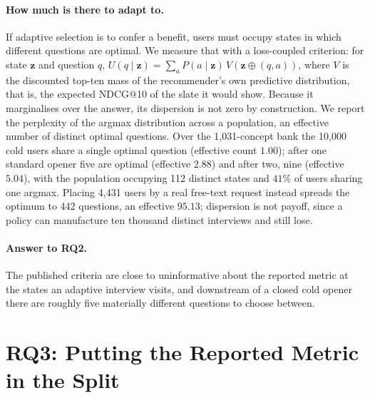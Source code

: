 \documentclass[runningheads]{llncs}
\newcommand{\zz}{\mathbf{z}}
\begin{document}
\paragraph{How much is there to adapt to.}
If adaptive selection is to confer a benefit, users must occupy states in which different questions
are optimal. We measure that with a loss-coupled criterion: for state $\zz$ and question $q$,
$U(q\mid\zz)=\sum_a P(a\mid\zz)\,V(\zz\oplus(q,a))$, where $V$ is the discounted top-ten mass of the
recommender's own predictive distribution, that is, the expected NDCG@10 of the slate it would show.
Because it marginalises over the answer, its dispersion is not zero by construction. We report the
perplexity of the argmax distribution across a population, an effective number of distinct optimal
questions. Over the 1{,}031-concept bank the 10{,}000 cold users share a single optimal question
(effective count $1.00$); after one standard opener five are optimal (effective $2.88$) and after two,
nine (effective $5.04$), with the population occupying 112 distinct states and $41\%$ of users sharing
one argmax. Placing 4{,}431 users by a real free-text request instead spreads the optimum to 442
questions, an effective $95.13$; dispersion is not payoff, since a policy can manufacture ten thousand
distinct interviews and still lose.

\paragraph{Answer to RQ2.}
The published criteria are close to uninformative about the reported metric at the states an adaptive
interview visits, and downstream of a closed cold opener there are roughly five materially different
questions to choose between.

\section{RQ3: Putting the Reported Metric in the Split}
\label{sec:rq3}
\end{document}
